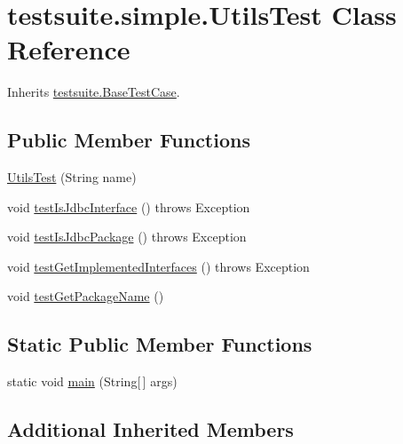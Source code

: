 \hypertarget{classtestsuite_1_1simple_1_1_utils_test}{}\section{testsuite.\+simple.\+Utils\+Test Class Reference}
\label{classtestsuite_1_1simple_1_1_utils_test}


Inherits \mbox{\hyperlink{classtestsuite_1_1_base_test_case}{testsuite.\+Base\+Test\+Case}}.

\subsection*{Public Member Functions}
\begin{DoxyCompactItemize}
\item 
\mbox{\hyperlink{classtestsuite_1_1simple_1_1_utils_test_ae8295b4d62a676991726c1e76e0192e9}{Utils\+Test}} (String name)
\item 
void \mbox{\hyperlink{classtestsuite_1_1simple_1_1_utils_test_a5983623d2b264a98e4d7a3859d1404c7}{test\+Is\+Jdbc\+Interface}} ()  throws Exception 
\item 
void \mbox{\hyperlink{classtestsuite_1_1simple_1_1_utils_test_acdd7d8143bc1dede650e3c5991d92193}{test\+Is\+Jdbc\+Package}} ()  throws Exception 
\item 
void \mbox{\hyperlink{classtestsuite_1_1simple_1_1_utils_test_a173e24f02866b3c9a9356d28077db9b3}{test\+Get\+Implemented\+Interfaces}} ()  throws Exception 
\item 
void \mbox{\hyperlink{classtestsuite_1_1simple_1_1_utils_test_a15e2df447f329b76ef2115f6583296c0}{test\+Get\+Package\+Name}} ()
\end{DoxyCompactItemize}
\subsection*{Static Public Member Functions}
\begin{DoxyCompactItemize}
\item 
static void \mbox{\hyperlink{classtestsuite_1_1simple_1_1_utils_test_a131ce08ba1049981947b3982e95d9e34}{main}} (String\mbox{[}$\,$\mbox{]} args)
\end{DoxyCompactItemize}
\subsection*{Additional Inherited Members}


